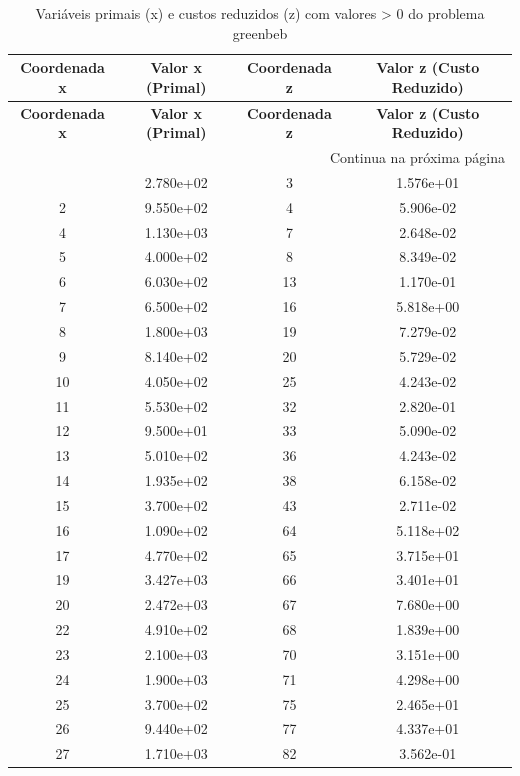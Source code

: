 \documentclass[12pt]{article}
\begin{document}
\begin{longtable}{@{}cccc@{}}
\caption{Variáveis primais (x) e custos reduzidos (z) com valores > 0 do problema greenbeb} \\
\toprule
\textbf{Coordenada x} & \textbf{Valor x (Primal)} & \textbf{Coordenada z} & \textbf{Valor z (Custo Reduzido)} \\
\midrule
\endfirsthead

\toprule
\textbf{Coordenada x} & \textbf{Valor x (Primal)} & \textbf{Coordenada z} & \textbf{Valor z (Custo Reduzido)} \\
\midrule
\endhead

\midrule \multicolumn{4}{r}{{Continua na próxima página}} \\ \midrule
\endfoot

\bottomrule
\endlastfoot
1 & 2.780e+02 & 3 & 1.576e+01 \\
2 & 9.550e+02 & 4 & 5.906e-02 \\
4 & 1.130e+03 & 7 & 2.648e-02 \\
5 & 4.000e+02 & 8 & 8.349e-02 \\
6 & 6.030e+02 & 13 & 1.170e-01 \\
7 & 6.500e+02 & 16 & 5.818e+00 \\
8 & 1.800e+03 & 19 & 7.279e-02 \\
9 & 8.140e+02 & 20 & 5.729e-02 \\
10 & 4.050e+02 & 25 & 4.243e-02 \\
11 & 5.530e+02 & 32 & 2.820e-01 \\
12 & 9.500e+01 & 33 & 5.090e-02 \\
13 & 5.010e+02 & 36 & 4.243e-02 \\
14 & 1.935e+02 & 38 & 6.158e-02 \\
15 & 3.700e+02 & 43 & 2.711e-02 \\
16 & 1.090e+02 & 64 & 5.118e+02 \\
17 & 4.770e+02 & 65 & 3.715e+01 \\
19 & 3.427e+03 & 66 & 3.401e+01 \\
20 & 2.472e+03 & 67 & 7.680e+00 \\
22 & 4.910e+02 & 68 & 1.839e+00 \\
23 & 2.100e+03 & 70 & 3.151e+00 \\
24 & 1.900e+03 & 71 & 4.298e+00 \\
25 & 3.700e+02 & 75 & 2.465e+01 \\
26 & 9.440e+02 & 77 & 4.337e+01 \\
27 & 1.710e+03 & 82 & 3.562e-01 \\

\end{longtable}
\end{document}
